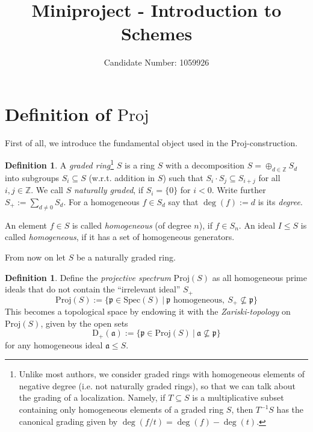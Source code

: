 \documentclass{scrartcl}
\title{Miniproject - Introduction to Schemes}
\author{Candidate Number: 1059926}
\newcommand{\Z}{\mathbb{Z}}
\newcommand{\D}[1]{\mathrm{D}_+(#1)}
\newcommand{\p}{\mathfrak{p}}
\renewcommand{\a}{\mathfrak{a}}
\newcommand{\Spec}{\mathrm{Spec}}
\newcommand{\Proj}{\mathrm{Proj}}
\theoremstyle{definition}
\newtheorem{definition}[subsection]{Definition}
\begin{document}
\maketitle

\tableofcontents

\section{Definition of $\Proj$}

First of all, we introduce the fundamental object used in the $\Proj$-construction.
\begin{definition}
    A \emph{graded ring}\footnote{
        Unlike most authors, we consider graded rings with homogeneous elements of negative degree (i.e. not naturally graded rings), so that we can talk about the grading of a localization.
        Namely, if $T \subseteq S$ is a multiplicative subset containing only homogeneous elements of a graded ring $S$, then $T^{-1}S$ has the canonical grading given by $\deg(f/t) = \deg(f) - \deg(t)$.
    } $S$ is a ring $S$ with a decomposition $S = \oplus_{d \in \Z} S_d$ into subgroups $S_i \subseteq S$ (w.r.t. addition in $S$) such that $S_i \cdot S_j \subseteq S_{i + j}$ for all $i, j \in \Z$.
    We call $S$ \emph{naturally graded}, if $S_i = \{ 0 \}$ for $i < 0$.
    Write further $S_+ := \sum_{d \neq 0} S_d$.
    For a homogeneous $f \in S_d$ say that $\deg(f) := d$ is its \emph{degree}.

    An element $f \in S$ is called \emph{homogeneous} (of degree $n$), if $f \in S_n$.
    An ideal $I \leq S$ is called \emph{homogeneous}, if it has a set of homogeneous generators.
\end{definition}
From now on let $S$ be a naturally graded ring.
\begin{definition}
    Define the \emph{projective spectrum} $\Proj(S)$ as all homogeneous prime ideals that do not contain the ``irrelevant ideal'' $S_+$
    \begin{equation*}
        \Proj(S) := \{ \p \in \Spec(S) \ | \ \text{$\p$ homogeneous}, \ S_+ \not\subseteq \p \}
    \end{equation*}
    This becomes a topological space by endowing it with the \emph{Zariski-topology} on $\Proj(S)$, given by the open sets
    \begin{equation*}
        \D{\a} := \{ \p \in \Proj(S) \ | \ \a \not\subseteq \p \}
    \end{equation*}
    for any homogeneous ideal $\a \leq S$.
\end{definition}
\end{document}
